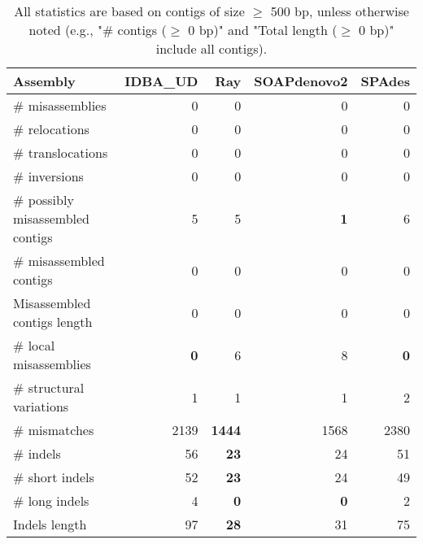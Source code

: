 \documentclass[12pt,a4paper]{article}
\begin{document}
\begin{table}[ht]
\begin{center}
\caption{All statistics are based on contigs of size $\geq$ 500 bp, unless otherwise noted (e.g., "\# contigs ($\geq$ 0 bp)" and "Total length ($\geq$ 0 bp)" include all contigs).}
\begin{tabular}{|l*{4}{|r}|}
\hline
Assembly & IDBA\_UD & Ray & SOAPdenovo2 & SPAdes \\ \hline
\# misassemblies & 0 & 0 & 0 & 0 \\ \hline
\hspace{5mm}\# relocations & 0 & 0 & 0 & 0 \\ \hline
\hspace{5mm}\# translocations & 0 & 0 & 0 & 0 \\ \hline
\hspace{5mm}\# inversions & 0 & 0 & 0 & 0 \\ \hline
\# possibly misassembled contigs & 5 & 5 & {\bf 1} & 6 \\ \hline
\# misassembled contigs & 0 & 0 & 0 & 0 \\ \hline
Misassembled contigs length & 0 & 0 & 0 & 0 \\ \hline
\# local misassemblies & {\bf 0} & 6 & 8 & {\bf 0} \\ \hline
\# structural variations & 1 & 1 & 1 & 2 \\ \hline
\# mismatches & 2139 & {\bf 1444} & 1568 & 2380 \\ \hline
\# indels & 56 & {\bf 23} & 24 & 51 \\ \hline
\hspace{5mm}\# short indels & 52 & {\bf 23} & 24 & 49 \\ \hline
\hspace{5mm}\# long indels & 4 & {\bf 0} & {\bf 0} & 2 \\ \hline
Indels length & 97 & {\bf 28} & 31 & 75 \\ \hline
\end{tabular}
\end{center}
\end{table}
\end{document}
